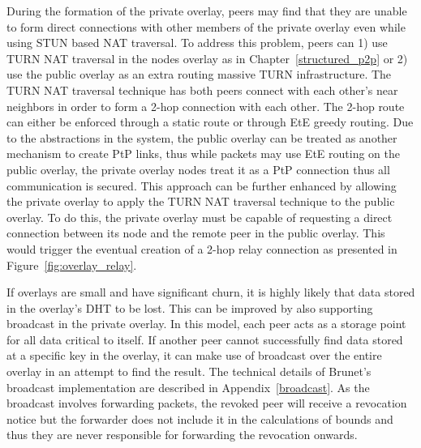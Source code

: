During the formation of the private overlay, peers may find that they are
unable to form direct connections with other members of the private overlay
even while using STUN based NAT traversal.   To address this problem, peers can
1) use TURN NAT traversal in the nodes overlay as in Chapter~\ref{structured_p2p}
or 2) use the public overlay as an extra routing massive TURN infrastructure.
The TURN NAT traversal technique has both peers connect with each other's near
neighbors in order to form a 2-hop connection with each other.  The 2-hop route
can either be enforced through a static route or through EtE greedy routing.
Due to the abstractions in the system, the public overlay can be treated as
another mechanism to create PtP links, thus while packets may use EtE routing
on the public overlay, the private overlay nodes treat it as a PtP connection
thus all communication is secured.  This approach can be further enhanced by
allowing the private overlay to apply the TURN NAT traversal technique to the
public overlay.  To do this, the private overlay must be capable of requesting
a direct connection between its node and the remote peer in the public overlay.
This would trigger the eventual creation of a 2-hop relay connection as
presented in Figure~\ref{fig:overlay_relay}.


If overlays are small and have significant churn, it is highly likely that data
stored in the overlay's DHT to be lost.  This can be improved by also supporting
broadcast in the private overlay.  In this model, each peer acts as a storage
point for all data critical to itself.  If another peer cannot successfully
find data stored at a specific key in the overlay, it can make use of broadcast
over the entire overlay in an attempt to find the result.  The technical details
of Brunet's broadcast implementation are described in Appendix~\ref{broadcast}.
As the broadcast involves forwarding packets, the revoked peer will receive
a revocation notice but the forwarder does not include it in the calculations
of bounds and thus they are never responsible for forwarding the revocation
onwards.


